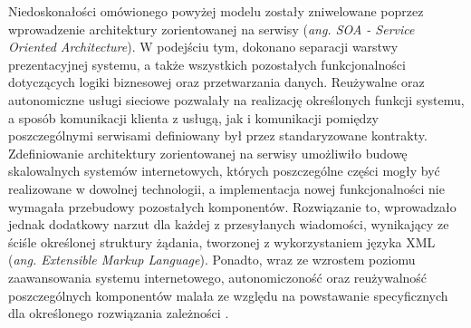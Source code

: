 Niedoskonałości omówionego powyżej modelu zostały zniwelowane poprzez wprowadzenie architektury zorientowanej na serwisy (\textit{ang. SOA - Service Oriented Architecture}). W podejściu tym, dokonano separacji warstwy prezentacyjnej systemu, a także wszystkich pozostałych funkcjonalności dotyczących logiki biznesowej oraz przetwarzania danych. Reużywalne oraz autonomiczne usługi sieciowe pozwalały na realizację określonych funkcji systemu, a sposób komunikacji klienta z usługą, jak i komunikacji pomiędzy poszczególnymi serwisami definiowany był przez standaryzowane kontrakty. Zdefiniowanie architektury zorientowanej na serwisy umożliwiło budowę skalowalnych systemów internetowych, których poszczególne części mogły być realizowane w dowolnej technologii, a implementacja nowej funkcjonalności nie wymagała przebudowy pozostałych komponentów. Rozwiązanie to, wprowadzało jednak dodatkowy narzut dla każdej z przesyłanych wiadomości, wynikający ze ściśle określonej struktury żądania, tworzonej z wykorzystaniem języka XML (\textit{ang. Extensible Markup Language}). Ponadto, wraz ze wzrostem poziomu zaawansowania systemu internetowego, autonomiczoność oraz reużywalność poszczególnych komponentów malała ze względu na powstawanie specyficznych dla określonego rozwiązania zależności \cite{WANG2004309}.

